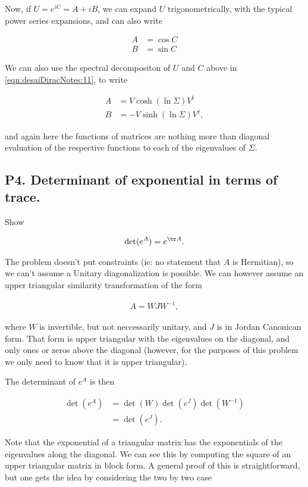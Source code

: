 Now, if $U = e^{iC} = A + iB$, we can expand $U$ trigonometrically, with the typical power series expansions, and can also write

\begin{align*}
A &= \cos C \\
B &= \sin C 
\end{align*}

We can also use the spectral decompositon of $U$ and $C$ above in \ref{eqn:desaiDiracNotes:11}, to write

\begin{align*}
A &= V \cosh(\ln \Sigma) V^\dagger \\
B &= -V \sinh(\ln \Sigma) V^\dagger,
\end{align*}

and again here the functions of matrices are nothing more than diagonal evaluation of the respective functions to each of the eigenvalues of $\Sigma$.

\subsection{P4. Determinant of exponential in terms of trace.}

Show 

\begin{align*}
\det (e^A) = e^{\tr A}.
\end{align*}

The problem doesn't put constraints (ie: no statement that $A$ is Hermitian), so we can't assume a Unitary diagonalization is possible.  We can however assume an upper triangular similarity transformation of the form

\begin{align*}
A = W J W^{-1},
\end{align*}

where $W$ is invertible, but not neccessarily unitary, and $J$ is in Jordan Canonican form.  That form is upper triangular with the eigenvalues on the diagonal, and only ones or zeros above the diagonal (however, for the purposes of this problem we only need to know that it is upper triangular).

The determinant of $e^A$ is then

\begin{align*}
\det(e^A) 
&=
\det(W) \det(e^J) \det(W^{-1}) \\
&=
\det(e^J).
\end{align*}

Note that the exponential of a triangular matrix has the exponentials of the eigenvalues along the diagonal.  We can see this by computing the square of an upper triangular matrix in block form.  A general proof of this is straightforward, but one gets the idea by considering the two by two case

